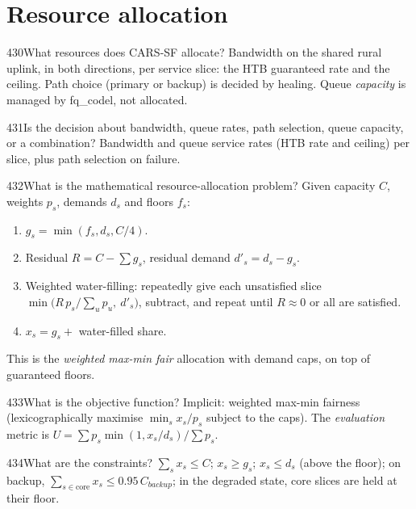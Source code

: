 \section{Resource allocation}

\FigAlloc

\begin{qa}{430}{What resources does CARS-SF allocate?}
Bandwidth on the shared rural uplink, in both directions, per service slice: the HTB guaranteed rate and the ceiling.
Path choice (primary or backup) is decided by healing. Queue \emph{capacity} is managed by fq\_codel, not allocated.
\end{qa}

\begin{qa}{431}{Is the decision about bandwidth, queue rates, path selection, queue capacity, or a combination?}
Bandwidth and queue service rates (HTB rate and ceiling) per slice, plus path selection on failure.
\end{qa}

\begin{qa}{432}{What is the mathematical resource-allocation problem?}
Given capacity $C$, weights $p_s$, demands $d_s$ and floors $f_s$:
\begin{enumerate}
\item $g_s=\min(f_s,d_s,C/4)$.
\item Residual $R=C-\sum g_s$, residual demand $d'_s=d_s-g_s$.
\item Weighted water-filling: repeatedly give each unsatisfied slice $\min\!\big(R\,p_s/\sum_{u}p_u,\ d'_s\big)$,
subtract, and repeat until $R\approx0$ or all are satisfied.
\item $x_s=g_s+$ water-filled share.
\end{enumerate}
This is the \emph{weighted max-min fair} allocation with demand caps, on top of guaranteed floors.
\end{qa}

\begin{qa}{433}{What is the objective function?}
Implicit: weighted max-min fairness (lexicographically maximise $\min_s x_s/p_s$ subject to the caps). The
\emph{evaluation} metric is $U=\sum p_s\min(1,x_s/d_s)/\sum p_s$.
\end{qa}

\begin{qa}{434}{What are the constraints?}
$\sum_s x_s\le C$; $x_s\ge g_s$; $x_s\le d_s$ (above the floor); on backup,
$\sum_{s\in\text{core}}x_s\le0.95\,C_{backup}$; in the degraded state, core slices are held at their floor.
\end{qa}

